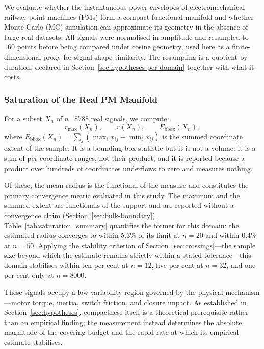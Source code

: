 \documentclass[10pt]{article}
\theoremstyle{plain}
\theoremstyle{definition}
\theoremstyle{remark}
\begin{document}
We evaluate whether the instantaneous power envelopes of electromechanical
railway point machines (PMs) form a compact functional manifold and whether
Monte Carlo (MC) simulation can approximate its geometry in the absence of
large real datasets. All signals were normalised in amplitude and resampled to
$160$ points before being compared under cosine geometry, used here as a
finite-dimensional proxy for signal-shape similarity. The resampling is a
quotient by duration, declared in Section~\ref{sec:hypotheses-per-domain}
together with what it costs.


\subsubsection{Saturation of the Real PM Manifold}

For a subset $X_n$ of $n$=8788 real signals, we compute:
\[
r_{\max}(X_n), \qquad
\bar{r}(X_n), \qquad
E_{\mathrm{bbox}}(X_n),
\]
where
$E_{\mathrm{bbox}}(X_n) = \sum_j \left( \max_i x_{ij} - \min_i x_{ij} \right)$
is the summed coordinate extent of the sample. It is a bounding-box statistic
but it is not a volume: it is a sum of per-coordinate ranges, not their
product, and it is reported because a product over hundreds of coordinates
underflows to zero and measures nothing.

Of these, the mean radius is the functional of the measure and constitutes the
primary convergence metric evaluated in this study. The maximum and the summed
extent are functionals of the support and are reported without a convergence
claim (Section~\ref{sec:bulk-boundary}). Table~\ref{tab:saturation_summary}
quantifies the former for this domain: the estimated radius converges to within
$5.3\%$ of its limit at $n=20$ and within $0.4\%$ at $n=50$. Applying
the stability criterion of Section~\ref{sec:crossings}---the sample size beyond
which the estimate remains strictly within a stated tolerance---this domain
stabilises within ten per cent at $n=12$, five per cent at $n=32$, and one per cent
only at $n=8000$.

These signals occupy a low-variability region governed by the physical mechanism---motor
torque, inertia, switch friction, and closure impact. As established in
Section~\ref{sec:hypotheses}, compactness itself is a theoretical prerequisite
rather than an empirical finding; the measurement instead determines the absolute
magnitude of the covering budget and the rapid rate at which its empirical estimate
stabilises.
\end{document}
